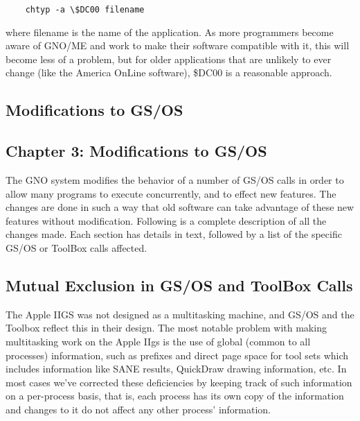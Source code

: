 \documentclass{report}
\begin{document}
\begin{verbatim}
    chtyp -a \$DC00 filename
\end{verbatim}

where filename is the name of the
application. As more programmers become aware of GNO/ME and work
to make their software compatible with it, this will become less
of a problem, but for older applications that are unlikely to
ever change (like the America OnLine software), \$DC00 is a
reasonable approach.

%
%

\begin{latexonly}
\chapter{Modifications to GS/OS}
\end{latexonly}
\begin{htmlonly}
\chapter{Chapter 3:  Modifications to GS/OS}
\end{htmlonly}

The GNO system modifies the behavior of a
number of GS/OS calls in order to allow many programs to execute
concurrently, and to effect new features. The changes are done in
such a way that old software can take advantage of these new
features without modification. Following is a complete
description of all the changes made. Each section has details in
text, followed by a list of the specific GS/OS or ToolBox calls
affected.

\section{Mutual Exclusion in GS/OS and ToolBox Calls}

The Apple IIGS was not designed as a
multitasking machine, and GS/OS and the Toolbox reflect this in
their design. The most notable problem with making multitasking
work on the Apple IIgs is the use of global (common to all
processes) information, such as prefixes and direct page space
for tool sets which includes information like SANE results,
QuickDraw drawing information, etc. In most cases we've corrected
these deficiencies by keeping track of such information on a
per-process basis, that is, each process has its own copy of the
information and changes to it do not affect any other process'
information.
\end{document}
